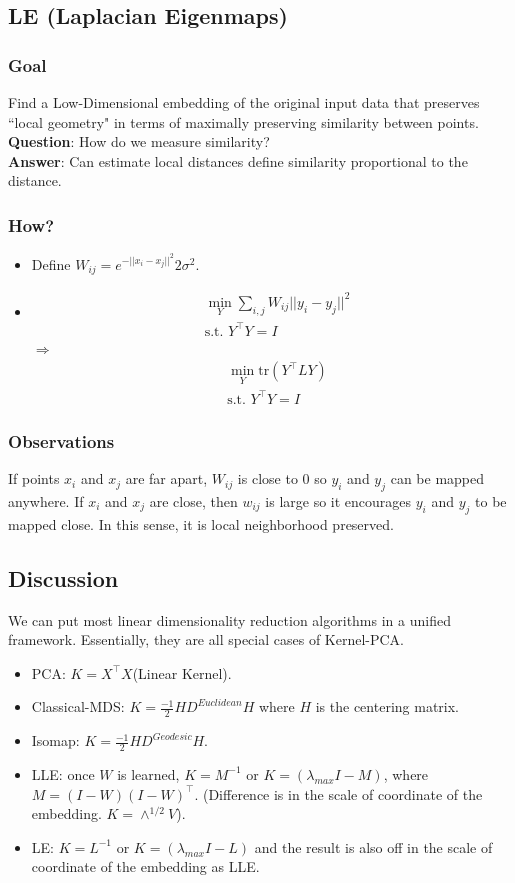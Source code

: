 \subsection*{LE (Laplacian Eigenmaps)}
\subsubsection*{Goal}
Find a Low-Dimensional embedding of the original input data that preserves ``local geometry" in terms of maximally preserving similarity
between points. 
\textbf{Question}: How do we measure similarity?\\
\textbf{Answer}: Can estimate local distances define similarity
proportional to the distance. 
\subsubsection*{How?}
\begin{itemize}
\item Define $W_{ij}=e^{-||x_i-x_j||^2}{2\sigma^2}$.
\item 
\begin{align*}
&\min_{Y} \sum_{i,j} W_{ij} ||y_i-y_j||^2\\
&\text{s.t. } Y^\intercal Y=I
\end{align*}
$\Rightarrow$
\begin{align*}
&\min_{Y} \text{tr} (Y^\intercal LY)\\
&\text{s.t. } Y^\intercal Y=I
\end{align*}
\end{itemize}
\subsubsection*{Observations}
If points $x_i$ and $x_j$ are far apart, $W_{ij}$ is close to 0 so
$y_i$ and $y_j$ can be mapped anywhere. If $x_i$ and $x_j$ are close,
then $w_{ij}$ is large so it encourages $y_i$ and $y_j$ to be mapped
close. In this sense, it is local neighborhood preserved. 

\subsection*{Discussion}
We can put most linear dimensionality reduction algorithms in a
unified framework. Essentially, they are all special cases of
Kernel-PCA. 
\begin{itemize}
\item PCA: $K=X^\intercal X$(Linear Kernel).
\item Classical-MDS: $K=\frac{-1}{2} HD^{Euclidean}H$ where $H$ is the
  centering matrix. 
\item Isomap: $K=\frac{-1}{2} HD^{Geodesic}H$.
\item LLE: once $W$ is learned, $K=M^{-1}$ or $K=(\lambda_{max} I -
  M)$, where $M=(I-W)(I-W)^\intercal$. (Difference is in the scale of
  coordinate of the embedding. $K=\wedge^{1/2} V$). 
\item LE: $K=L^{-1}$ or $K=(\lambda_{max} I - L)$ and the result is
  also off in the scale of coordinate of the embedding as LLE. 
\end{itemize}

